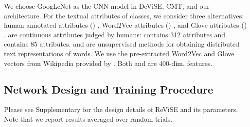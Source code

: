 {We choose GoogLeNet \cite{szegedy2015going} as the CNN model in DeViSE, CMT, and our architecture. For the textual attributes of classes, we consider three alternatives: human annotated attributes () \cite{lampert2014attribute}, Word2Vec attributes () \cite{mikolov2013distributed}, and Glove attributes () \cite{pennington2014glove}.  are continuous attributes judged by humans:  contains 312 attributes and  contains 85 attributes.  and  are unsupervised methods for obtaining distributed text representations of words. We use the pre-extracted Word2Vec and Glove vectors from Wikipedia provided by \cite{akata2015evaluation,xian2016latent}. Both  and  are 400-dim. features.

\subsection{Network Design and Training Procedure}
\label{subsec:train_pro}
{
	Please see Supplementary for the design details of ReViSE and its parameters. Note that we report results averaged over  random trials.

}

}
